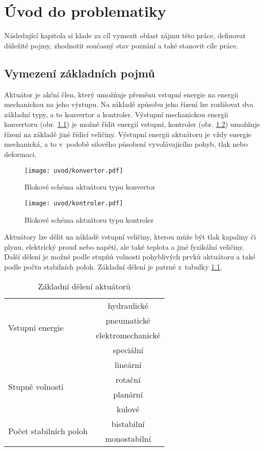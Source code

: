 \chapter{Úvod do problematiky}
Následující kapitola si klade za cíl vymezit oblast zájmu této práce, definovat důležité pojmy, zhodnotit současný stav poznání a také stanovit cíle práce.

\section{Vymezení základních pojmů}
Aktuátor je akční člen, který umožňuje přeměnu vstupní energie na energii mechanickou na jeho výstupu. Na základě způsobu jeho řízení lze rozlišovat dva základní typy, a to konvertor a kontroler. Výstupní mechanickou energii konvertoru (obr. \cref{obr:konvertor}) je možné řídit energií vstupní, kontroler (obr. \cref{obr:kontroler}) umožňuje řízení na základě jiné řídicí veličiny. Výstupní energii aktuátoru je vždy energie mechanická, a to v~podobě silového působení vyvolávajícího pohyb, tlak nebo deformaci. \cite{janocha2010actuators} \cite{ulrych2009aktuatory} \cite{mach2010aktuatory}

\begin{figure}[h!]
  \centering
  \texttt{[image: uvod/konvertor.pdf]}
  \caption{Blokové schéma aktuátoru typu konvertor}
  \label{obr:konvertor}
\end{figure}

\begin{figure}[h!]
  \centering
  \texttt{[image: uvod/kontroler.pdf]}
  \caption{Blokové schéma aktuátoru typu kontroler}
  \label{obr:kontroler}
\end{figure}

Aktuátory lze dělit na základě vstupní veličiny, kterou může být tlak kapaliny či plynu, elektrický proud nebo napětí, ale také teplota a jiné fyzikální veličiny. Další dělení je možné podle stupňů volnosti pohyblivých prvků aktuátoru a také podle počtu stabilních poloh. Základní dělení je patrné z~tabulky \cref{tab:deleni_aktuatoru}. \cite{brauer2006magnetic}

\begin{table}[h!]
\caption{Základní dělení aktuátorů}
\begin{center}
\begin{tabular}{|l|c|}
  \hline
  \multirow{4}{*}{Vstupní energie} & hydraulické \\
  & pneumatické \\
  & elektromechanické \\
  & speciální \\
  \hline
  \multirow{4}{*}{Stupně volnosti} & lineární \\
  & rotační \\
  & planární \\
  & kulové \\
  \hline
  \multirow{2}{*}{Počet stabilních poloh} & bistabilní \\
  & monostabilní \\
  \hline
\end{tabular}
\end{center}
\label{tab:deleni_aktuatoru}
\end{table}

